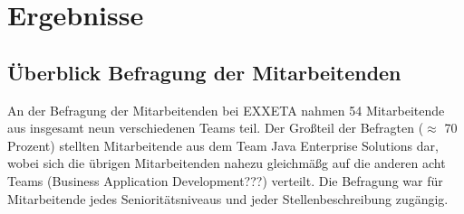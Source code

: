 
\chapter{Ergebnisse}
\label{ch:ergebnisse}

\section{Überblick Befragung der Mitarbeitenden}
An der Befragung der Mitarbeitenden bei EXXETA nahmen 54 Mitarbeitende aus insgesamt neun verschiedenen Teams teil.
Der Großteil der Befragten ($\approx$ 70 Prozent) stellten Mitarbeitende aus dem Team Java Enterprise Solutions dar, wobei sich die übrigen Mitarbeitenden nahezu gleichmäßg auf die anderen acht Teams (Business Application Development???) verteilt.
Die Befragung war für Mitarbeitende jedes Senioritätsniveaus und jeder Stellenbeschreibung zugängig.



